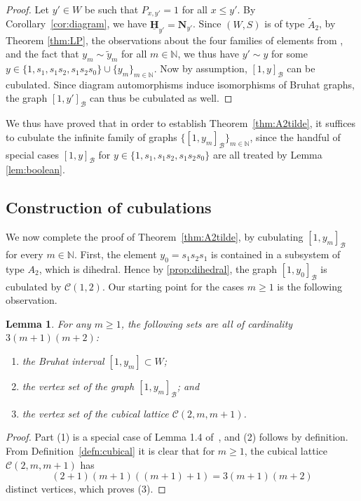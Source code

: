 \documentclass[11pt]{amsart}
\theoremstyle{plain}
\newtheorem{lemma}[thm]{Lemma}
\theoremstyle{definition}
\newcommand{\cC}{\mathcal{C}}
\newcommand{\N}{\mathbb{N}}
\newcommand{\cB}{\mathcal B}
\newcommand\KLbasis{\underline{\mathbf{H}}}
\newcommand\Ngen{\mathbf{N}}
\numberwithin{equation}{subsection}
\begin{document}
\begin{proof} 
Let $y' \in W$ be such that $P_{x,y'} = 1$ for all $x \leq y'$.  By Corollary~\ref{cor:diagram}, we have $\KLbasis_{y'} = \Ngen_{y'}$. Since $(W,S)$ is of type $\tilde{A}_2$, by Theorem \ref{thm:LP}, the observations about the four families of elements from \cite[Section 2.1]{BurrullLibedinskyPlaza}, and the fact that $y_m \sim \tilde{y}_m$ for all $m \in \N$, we thus have $y' \sim y$ for some $y \in \{ 1, s_1, s_1 s_2, s_1 s_2 s_0 \} \cup \{ y_m \}_{m \in \N}$. 
Now by assumption, $[1,y]_\cB$ can be cubulated. Since diagram automorphisms induce isomorphisms of Bruhat graphs, the graph $[1,y']_\cB$ can thus be cubulated as well.
\end{proof}

We thus have proved that in order to establish Theorem~\ref{thm:A2tilde}, it suffices to cubulate the infinite family of graphs $\{ [1,y_m]_\cB \}_{m \in \N}$, since the handful of special cases $[1,y]_\cB$ for $y \in \{ 1, s_1, s_1 s_2, s_1 s_2 s_0 \}$ are all treated by Lemma \ref{lem:boolean}.


\subsection{Construction of cubulations}\label{sec:infiniteA2tilde}

We now complete the proof of Theorem~\ref{thm:A2tilde}, by cubulating $[1,y_m]_\cB$ for every $m \in \N$. First, the element $y_0 = s_1 s_2 s_1$ is contained in a subsystem of type $A_2$, which is dihedral. Hence by \cref{prop:dihedral}, the graph $[1,y_0]_\cB$ is cubulated by $\cC(1,2)$. Our starting point for the cases $m \geq 1$ is the following observation.

\begin{lemma}\label{lem:sizeBruhatCubical} For any $m \geq 1$, the following sets are all of cardinality $3(m+1)(m+2)$:
\begin{enumerate}
\item the Bruhat interval $[1,y_m] \subset W$;
\item the vertex set of the graph $[1,y_m]_\cB$; and
\item the vertex set of the cubical lattice $\cC(2,m,m+1)$.
\end{enumerate}
\end{lemma}
\begin{proof} Part (1) is a special case of Lemma 1.4 of~\cite{LibedinskyPatimo}, and (2) follows by definition. From Definition~\ref{defn:cubical} it is clear that for $m \geq 1$, the cubical lattice $\cC(2,m,m+1)$ has \[ (2+1)(m+1)((m+1) + 1) = 3(m+1)(m+2) \] distinct vertices, which proves (3).
\end{proof}
\end{document}
